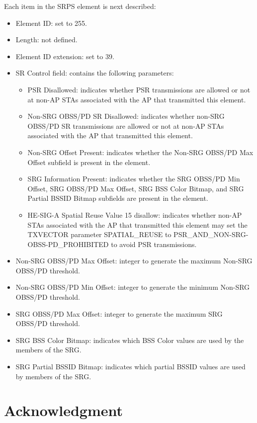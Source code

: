 \documentclass[preprint,12pt]{elsarticle}
\begin{document}
Each item in the SRPS element is next described:
\begin{itemize}
	\item Element ID: set to 255.
	\item Length: not defined.
	\item Element ID extension: set to 39.
	\item SR Control field: contains the following parameters:
	\begin{itemize}
		\item PSR Disallowed: indicates whether PSR transmissions are allowed or not at non-AP STAs associated with the AP that transmitted this element.
		\item Non-SRG OBSS/PD SR Disallowed: indicates whether non-SRG OBSS/PD SR transmissions are allowed or not at non-AP STAs associated with the AP that transmitted this element.
		\item Non-SRG Offset Present: indicates whether the Non-SRG OBSS/PD Max Offset subfield is present in the element.
		\item SRG Information Present: indicates whether the SRG OBSS/PD Min Offset, SRG OBSS/PD Max Offset, SRG BSS Color Bitmap, and SRG Partial BSSID Bitmap subfields are present in the element.
		\item HE-SIG-A Spatial Reuse Value 15 disallow: indicates whether non-AP STAs associated with the AP that transmitted this element may set the TXVECTOR parameter SPATIAL\_REUSE to PSR\_AND\_NON-SRG-OBSS-PD\_PROHIBITED to avoid PSR transmissions.
	\end{itemize}
	\item Non-SRG OBSS/PD Max Offset: integer to generate the maximum Non-SRG OBSS/PD threshold.
	\item Non-SRG OBSS/PD Min Offset: integer to generate the minimum Non-SRG OBSS/PD threshold.
	\item SRG OBSS/PD Max Offset: integer to generate the maximum SRG OBSS/PD threshold.
	\item SRG BSS Color Bitmap: indicates which BSS Color values are used by the members of the SRG.
	\item SRG Partial BSSID Bitmap: indicates which partial BSSID values are used by members of the SRG.
\end{itemize}

\section*{Acknowledgment}
\end{document}
